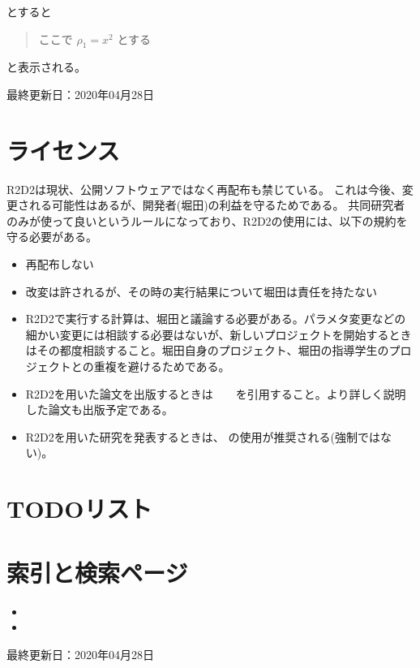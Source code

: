 \documentclass[letterpaper,10pt,dvipdfmx,report]{sphinxmanual}
\begin{document}
とすると
\begin{quote}

ここで \(\rho_1=x^2\) とする
\end{quote}

と表示される。

最終更新日：2020年04月28日


\chapter{ライセンス}
\label{\detokenize{index:id1}}
R2D2は現状、公開ソフトウェアではなく再配布も禁じている。
これは今後、変更される可能性はあるが、開発者(堀田)の利益を守るためである。
共同研究者のみが使って良いというルールになっており、R2D2の使用には、以下の規約を守る必要がある。
\begin{itemize}
\item {} 
再配布しない

\item {} 
改変は許されるが、その時の実行結果について堀田は責任を持たない

\item {} 
R2D2で実行する計算は、堀田と議論する必要がある。パラメタ変更などの細かい変更には相談する必要はないが、新しいプロジェクトを開始するときはその都度相談すること。堀田自身のプロジェクト、堀田の指導学生のプロジェクトとの重複を避けるためである。

\item {} 
R2D2を用いた論文を出版するときは　　を引用すること。より詳しく説明した論文も出版予定である。

\item {} 
R2D2を用いた研究を発表するときは、 の使用が推奨される(強制ではない)。

\end{itemize}


\chapter{TODOリスト}
\label{\detokenize{index:todo}}

\chapter{索引と検索ページ}
\label{\detokenize{index:id3}}\begin{itemize}
\item {} 

\item {} 

\end{itemize}

最終更新日：2020年04月28日


\renewcommand{\indexname}{Pythonモジュール索引}
\begin{sphinxtheindex}
\let\bigletter\sphinxstyleindexlettergroup
\bigletter{r}
\item\relax{}
\end{sphinxtheindex}

\renewcommand{\indexname}{索引}
\printindex
\end{document}
